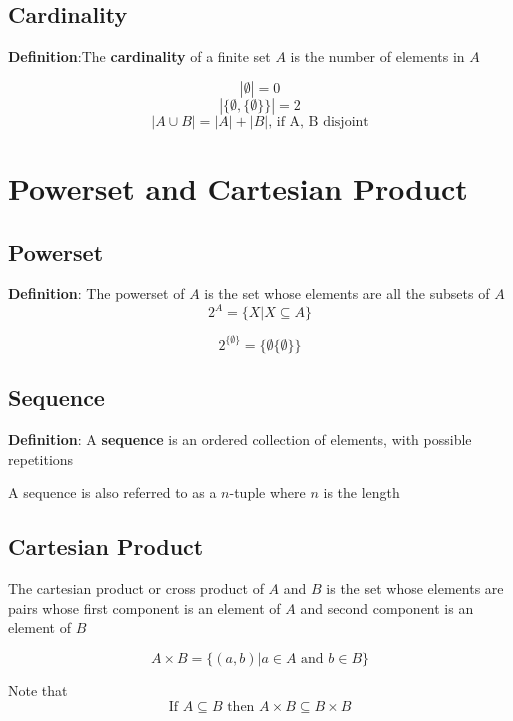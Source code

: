 \subsection{Cardinality}

\begin{framed}
 \textbf{Definition}:The \textbf{cardinality} of a finite set $A$ is the number of elements in $A$
\end{framed}

\[
  | \emptyset | = 0
\] 
\[
   \left| \{\emptyset, \{\emptyset\} \} \right|  = 2
\] 
\[
  |A \cup B| = |A| + |B| \text{, if A, B disjoint}
\] 

\section{Powerset and Cartesian Product}

\subsection{Powerset}

\begin{framed}
   \textbf{Definition}: The powerset of $A$ is the set whose elements are all the subsets of $A$ 
   \[
      2^A = \{X | X \subseteq A\}
   \] 
\end{framed}

\[
   2^{\{\emptyset\}} = \{ \emptyset \{\emptyset\}\}
\] 

\subsection{Sequence}
\begin{framed}
   \textbf{Definition}: A \textbf{sequence} is an ordered collection of elements, with possible repetitions
\end{framed}

A sequence is also referred to as a $n$-tuple where $n$ is the length

\subsection{Cartesian Product}

\begin{framed}
   The cartesian product or cross product of $A$ and $B$ is the set whose elements are pairs whose first component is an element of $A$ and second component is an element of $B$

    \[
       A \times B = \{(a, b) | a \in A \text{ and } b \in B \}
   \] 
\end{framed}

Note that 
\[
  \text{If } A \subseteq B \text{ then } A \times B \subseteq B \times B
\] 













